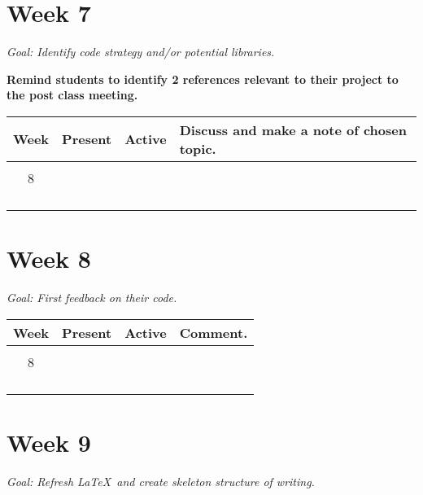 \documentclass[12pt]{article}
\begin{document}
\section*{Week 7}
\centering\small{\textit{Goal: Identify code strategy and/or potential libraries.}}

\textbf{Remind students to identify 2 references relevant to their project to
the post class meeting.}

\begin{center}
	\begin{tabular}{c|l|l|p{}}
		\toprule
		Week        & Present & Active & Discuss and make a note of chosen topic.\\
		\midrule
		            &         &        & \\
		8           &         &        & \\
		            &         &        & \\
		            &         &        & \\
		            &         &        & \\
		            &         &        & \\
	\end{tabular}
\end{center}

\newpage

\section*{Week 8}
\centering\small{\textit{Goal: First feedback on their code.}}

\begin{center}
	\begin{tabular}{c|l|l|p{}}
		\toprule
		Week        & Present & Active & Comment.\\
		\midrule
		            &         &        & \\
		8           &         &        & \\
		            &         &        & \\
		            &         &        & \\
		            &         &        & \\
		            &         &        & \\
	\end{tabular}
\end{center}

\section*{Week 9}
\centering\small{\textit{Goal: Refresh \LaTeX\ and create skeleton structure of writing.}}
\end{document}
